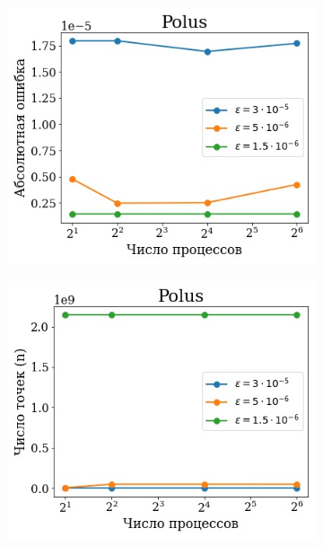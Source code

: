 \documentclass[12pt, fleqn]{article}
\theoremstyle{definition}
\begin{document}
\begin{figure}[ht!]
    \centering
    \begin{subfigure}[t]{0.45\textwidth}
        \centering
        \includegraphics[width=\linewidth]{polus_err.jpg} 
        \caption{}\label{fig:pl_err}
    \end{subfigure}
    \hfill
    \begin{subfigure}[t]{0.45\textwidth}
        \centering
        \includegraphics[width=\linewidth]{polus_n.jpg} 
        \caption{}\label{fig:pl_n}
    \end{subfigure}

\end{figure}
\end{document}
